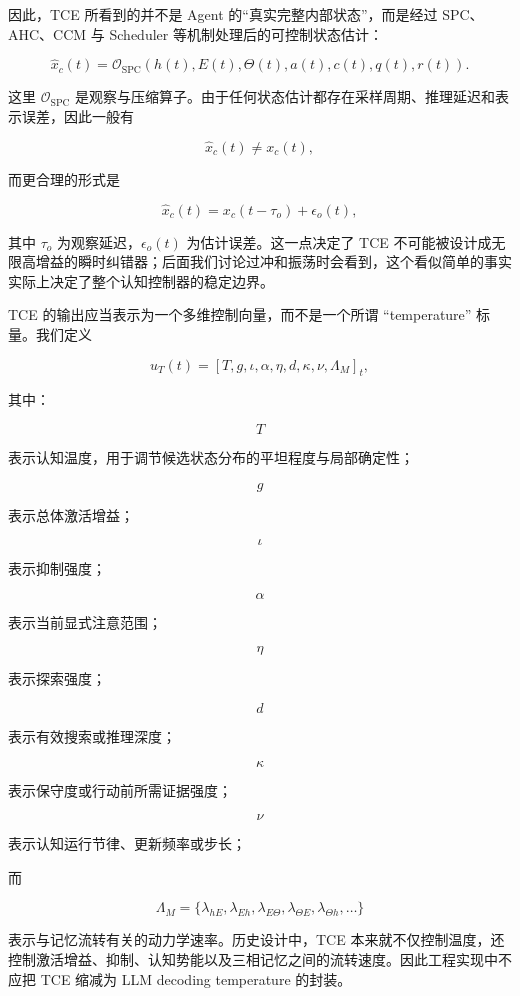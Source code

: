 因此，TCE 所看到的并不是 Agent 的“真实完整内部状态”，而是经过 SPC、AHC、CCM 与 Scheduler 等机制处理后的可控制状态估计：

\[
\hat x_c(t)
=
\mathcal O_{\mathrm{SPC}}
\left(
h(t),E(t),\Theta(t),a(t),c(t),q(t),r(t)
\right).
\]

这里 $\mathcal O_{\mathrm{SPC}}$ 是观察与压缩算子。由于任何状态估计都存在采样周期、推理延迟和表示误差，因此一般有

\[
\hat x_c(t)\neq x_c(t),
\]

而更合理的形式是

\[
\hat x_c(t)
=
x_c(t-\tau_o)+\epsilon_o(t),
\]

其中 $\tau_o$ 为观察延迟，$\epsilon_o(t)$ 为估计误差。这一点决定了 TCE 不可能被设计成无限高增益的瞬时纠错器；后面我们讨论过冲和振荡时会看到，这个看似简单的事实实际上决定了整个认知控制器的稳定边界。

TCE 的输出应当表示为一个多维控制向量，而不是一个所谓 ``temperature'' 标量。我们定义

\[
u_T(t)
=
\left[
T,
g,
\iota,
\alpha,
\eta,
d,
\kappa,
\nu,
\Lambda_M
\right]_t,
\]

其中：

\[
T
\]

表示认知温度，用于调节候选状态分布的平坦程度与局部确定性；

\[
g
\]

表示总体激活增益；

\[
\iota
\]

表示抑制强度；

\[
\alpha
\]

表示当前显式注意范围；

\[
\eta
\]

表示探索强度；

\[
d
\]

表示有效搜索或推理深度；

\[
\kappa
\]

表示保守度或行动前所需证据强度；

\[
\nu
\]

表示认知运行节律、更新频率或步长；

而

\[
\Lambda_M
=
\{
\lambda_{hE},
\lambda_{Eh},
\lambda_{E\Theta},
\lambda_{\Theta E},
\lambda_{\Theta h},
\ldots
\}
\]

表示与记忆流转有关的动力学速率。历史设计中，TCE 本来就不仅控制温度，还控制激活增益、抑制、认知势能以及三相记忆之间的流转速度。因此工程实现中不应把 TCE 缩减为 LLM decoding temperature 的封装。

